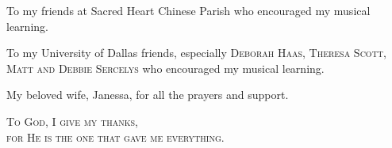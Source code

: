 \documentclass[11pt,oneside]{book} %
\begin{document}
\begin{paragraph}
To my friends at Sacred Heart Chinese Parish
who encouraged my musical learning.
\end{paragraph}

\begin{paragraph}
To my University of Dallas friends, especially
\textsc{Deborah Haas, Theresa Scott, Matt and Debbie Sercelys}
who encouraged my musical learning.
\end{paragraph}

\begin{paragraph}
My beloved wife, Janessa, for all the prayers
and support.
\end{paragraph}

\vspace{22 pt}

\begin{center}\begin{large}
\textsc{To God, I give my thanks, \\
for He is the one that gave me everything.}
\end{large}\end{center}



\end{document}
